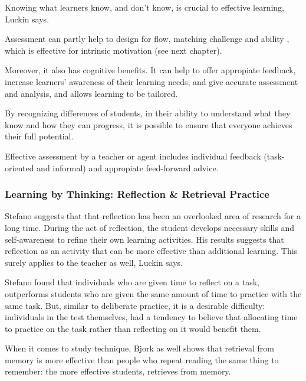   Knowing what learners know, and don't know, is crucial to effective learning, Luckin \cite{luckin} says.

  Assessment can partly help to design for flow, matching challenge and ability \cite{bruhlmann}, which is effective for intrinsic motivation (see next chapter).

  Moreover, it also has cognitive benefits. It can help to offer appropiate feedback, increase learners' awareness of their learning needs, and give accurate assessment and analysis, and allows learning to be tailored.

  By recognizing differences of students, in their ability to understand what they know and how they can progress, it is possible to ensure that everyone achieves their full potential.

  Effective assessment by a teacher or agent includes individual feedback (task-oriented and informal) and appropiate feed-forward advice.

  \subsubsection{Learning by Thinking: Reflection \& Retrieval Practice}

  Stefano \cite{stefano} suggests that that reflection has been an overlooked area of research for a long time. During the act of reflection, the student develops necessary skills and self-awareness to refine their own learning activities. His results suggests that reflection as an activity that can be more effective than additional learning. This surely applies to the teacher as well, Luckin says. \cite{luckin}

  Stefano found that individuals who are given time to reflect on a task, outperforms students who are given the same amount of time to practice with the same task. But, similar to deliberate practice, it is a desirable difficulty: individuals in the test themselves, had a tendency to believe that allocating time to practice on the task rather than reflecting on it would benefit them.


  When it comes to study technique, Bjork \cite{bjork} as well shows that retrieval from memory is more effective than people who repeat reading the same thing to remember: the more effective students, retrieves from memory.

